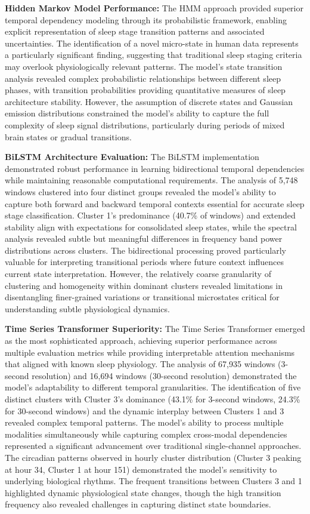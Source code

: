 \documentclass[a4paper,12pt,twoside]{article}
\begin{document}
\textbf{Hidden Markov Model Performance:}
The HMM approach provided superior temporal dependency modeling through its probabilistic framework, enabling explicit representation of sleep stage transition patterns and associated uncertainties. The identification of a novel micro-state in human data represents a particularly significant finding, suggesting that traditional sleep staging criteria may overlook physiologically relevant patterns. The model's state transition analysis revealed complex probabilistic relationships between different sleep phases, with transition probabilities providing quantitative measures of sleep architecture stability. However, the assumption of discrete states and Gaussian emission distributions constrained the model's ability to capture the full complexity of sleep signal distributions, particularly during periods of mixed brain states or gradual transitions.

\textbf{BiLSTM Architecture Evaluation:}
The BiLSTM implementation demonstrated robust performance in learning bidirectional temporal dependencies while maintaining reasonable computational requirements. The analysis of 5,748 windows clustered into four distinct groups revealed the model's ability to capture both forward and backward temporal contexts essential for accurate sleep stage classification. Cluster 1's predominance (40.7\% of windows) and extended stability align with expectations for consolidated sleep states, while the spectral analysis revealed subtle but meaningful differences in frequency band power distributions across clusters. The bidirectional processing proved particularly valuable for interpreting transitional periods where future context influences current state interpretation. However, the relatively coarse granularity of clustering and homogeneity within dominant clusters revealed limitations in disentangling finer-grained variations or transitional microstates critical for understanding subtle physiological dynamics.

\textbf{Time Series Transformer Superiority:}
The Time Series Transformer emerged as the most sophisticated approach, achieving superior performance across multiple evaluation metrics while providing interpretable attention mechanisms that aligned with known sleep physiology. The analysis of 67,935 windows (3-second resolution) and 16,694 windows (30-second resolution) demonstrated the model's adaptability to different temporal granularities. The identification of five distinct clusters with Cluster 3's dominance (43.1\% for 3-second windows, 24.3\% for 30-second windows) and the dynamic interplay between Clusters 1 and 3 revealed complex temporal patterns. The model's ability to process multiple modalities simultaneously while capturing complex cross-modal dependencies represented a significant advancement over traditional single-channel approaches. The circadian patterns observed in hourly cluster distribution (Cluster 3 peaking at hour 34, Cluster 1 at hour 151) demonstrated the model's sensitivity to underlying biological rhythms. The frequent transitions between Clusters 3 and 1 highlighted dynamic physiological state changes, though the high transition frequency also revealed challenges in capturing distinct state boundaries.
\end{document}
